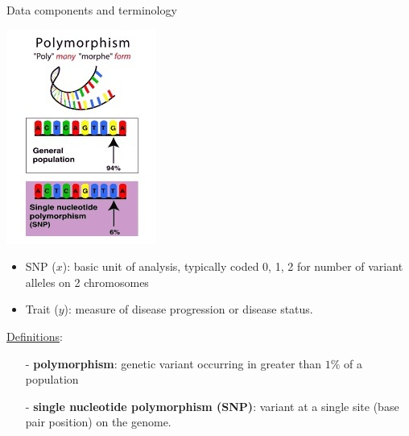 \begin{frame}{Data components and terminology}
\begin{multicols}{2}
\centerline{\includegraphics[scale=.6,angle=0]{polymorphism2.jpg}}
\vspace{.25in}
\begin{itemize}
\item SNP ($x$): basic unit of analysis, typically coded 0, 1, 2 for number of variant alleles on 2 chromosomes
\item Trait ($y$): measure of disease progression or disease status.
\end{itemize}
\end{multicols}
\scriptsize
\underline{Definitions}: 
\begin{enumerate}
\item[-] {\bf polymorphism}: genetic variant occurring in greater than $1\%$ of a population
\item[-] {\bf single nucleotide polymorphism (SNP)}: variant at a single site (base pair position) on the genome.
\end{enumerate}

\end{frame}

\begin{frame}
\end{frame}


